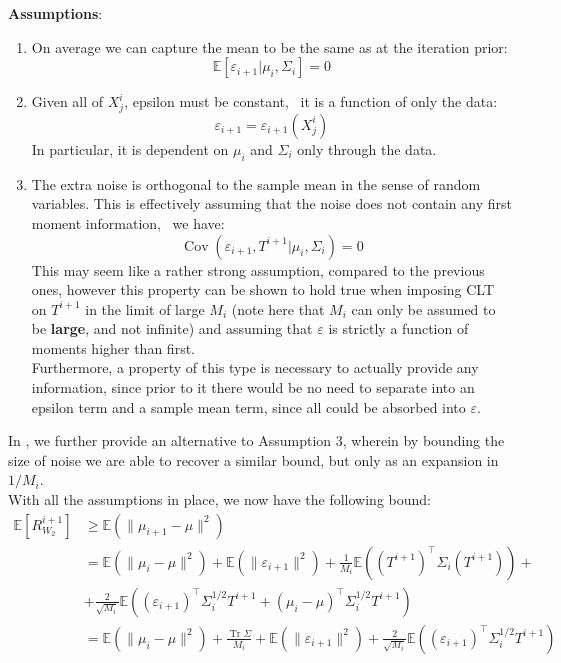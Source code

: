 \textbf{Assumptions}:
\begin{enumerate}
    \item On average we can capture the mean to be the same as at the iteration prior: 
    \begin{equation}
        \mathbb{E}[\varepsilon_{i+1}|\mu_i,\Sigma_i]=0
    \end{equation}
    \item Given all of $X^i_j$, epsilon must be constant, \ie~it is a function of only the data:
    \begin{equation}
        \varepsilon_{i+1} = \varepsilon_{i+1}\left(X^i_j\right)
    \end{equation}
    In particular, it is dependent on $\mu_i$ and $\Sigma_i$ only through the data.
    \item The extra noise is orthogonal to the sample mean in the sense of random variables. This is effectively assuming that the noise does not contain any first moment information, \ie~we have:
    \begin{equation}
        \operatorname{Cov}(\varepsilon_{i+1},T^{i+1}|\mu_i,\Sigma_i)=0
    \end{equation}
    This may seem like a rather strong assumption, compared to the previous ones, however this property can be shown to hold true when imposing CLT on $T^{i+1}$ in the limit of large $M_i$ (note here that $M_i$ can only be assumed to be \textbf{large}, and not infinite) and assuming that $\varepsilon$ is strictly a function of moments higher than first. \\
    Furthermore, a property of this type is necessary to actually provide any information, since prior to it there would be no need to separate into an epsilon term and a sample mean term, since all could be absorbed into $\varepsilon$. 
\end{enumerate}
In , we further provide an alternative to Assumption 3, wherein by bounding the size of noise we are able to recover a similar bound, but only as an expansion in $1/M_i$.
\\
With all the assumptions in place, we now have the following bound:
\begin{align}
\label{eq:mean_risk_2}
\mathbb{E}\left[R^{i+1}_{W_2}\right]&\geq\mathbb{E}\left(\|\mu_{i+1}-\mu\|^2\right)\\&=\mathbb{E}\left(\|\mu_{i}-\mu\|^2\right)+\mathbb{E}\left(\|\varepsilon_{i+1}\|^2\right)+\frac{1}{M_i}\mathbb{E}\left((T^{i+1})^{\top}\Sigma_i(T^{i+1})\right)+\\&+\frac{2}{\sqrt{M_i}}\mathbb{E}\left((\varepsilon_{i+1})^{\top}\Sigma^{1/2}_iT^{i+1} + (\mu_i-\mu)^{\top}\Sigma^{1/2}_iT^{i+1} \right)\\&=\mathbb{E}\left(\|\mu_{i}-\mu\|^2\right)+\frac{\operatorname{Tr}\Sigma}{M_i}+\mathbb{E}\left(\|\varepsilon_{i+1}\|^2\right)+\frac{2}{\sqrt{M_i}}\mathbb{E}\left((\varepsilon_{i+1})^{\top}\Sigma^{1/2}_iT^{i+1} \right)
\end{align}
